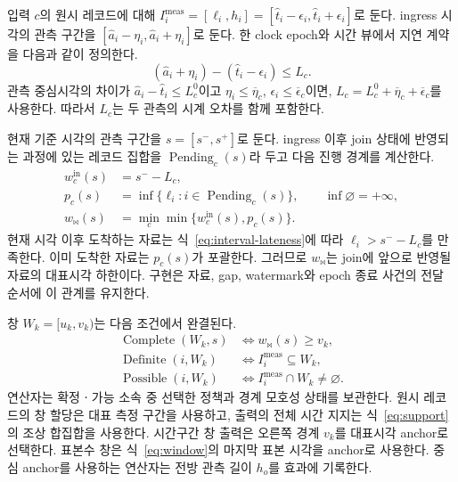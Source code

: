 입력 $c$의 원시 레코드에 대해
$I_i^{\mathrm{meas}}=[\ell_i,h_i]
=[\widehat t_i-\epsilon_i,\widehat t_i+\epsilon_i]$로 둔다.
ingress 시각의 관측 구간을
$[\widehat a_i-\eta_i,\widehat a_i+\eta_i]$로 둔다.
한 clock epoch와 시간 뷰에서 지연 계약을 다음과 같이 정의한다.
\begin{equation}
 (\widehat a_i+\eta_i)-(\widehat t_i-\epsilon_i)\le L_c.
 \label{eq:interval-lateness}
\end{equation}
관측 중심시각의 차이가 $\widehat a_i-\widehat t_i\le L_c^0$이고
$\eta_i\le\overline\eta_c$, $\epsilon_i\le\overline\epsilon_c$이면,
$L_c=L_c^0+\overline\eta_c+\overline\epsilon_c$를 사용한다.
따라서 $L_c$는 두 관측의 시계 오차를 함께 포함한다.

현재 기준 시각의 관측 구간을 $s=[s^-,s^+]$로 둔다.
ingress 이후 join 상태에 반영되는 과정에 있는 레코드 집합을
$\operatorname{Pending}_c(s)$라 두고 다음 진행 경계를 계산한다.
\begin{equation}
 \begin{aligned}
 w_c^{\mathrm{in}}(s)&=s^--L_c,\\
 p_c(s)&=\inf\{\ell_i:i\in\operatorname{Pending}_c(s)\},
                  \qquad\inf\varnothing=+\infty,\\
 w_{\Join}(s)&=\min_c\min\{w_c^{\mathrm{in}}(s),p_c(s)\}.
 \end{aligned}
 \label{eq:pending-watermark}
\end{equation}
현재 시각 이후 도착하는 자료는 식~\eqref{eq:interval-lateness}에 따라
$\ell_i>s^--L_c$를 만족한다. 이미 도착한 자료는 $p_c(s)$가 포괄한다.
그러므로 $w_{\Join}$는 join에 앞으로 반영될 자료의 대표시각 하한이다.
구현은 자료, gap, watermark와 epoch 종료 사건의 전달 순서에 이 관계를 유지한다.

창 $W_k=[u_k,v_k)$는 다음 조건에서 완결된다.
\begin{equation}
 \begin{aligned}
 \operatorname{Complete}(W_k,s)&\iff w_{\Join}(s)\ge v_k,\\
 \operatorname{Definite}(i,W_k)&\iff I_i^{\mathrm{meas}}\subseteq W_k,\\
 \operatorname{Possible}(i,W_k)&\iff
                         I_i^{\mathrm{meas}}\cap W_k\ne\varnothing.
 \end{aligned}
 \label{eq:window-complete}
\end{equation}
연산자는 확정ㆍ가능 소속 중 선택한 정책과 경계 모호성 상태를 보관한다.
원시 레코드의 창 할당은 대표 측정 구간을 사용하고,
출력의 전체 시간 지지는 식~\eqref{eq:support}의 조상 합집합을 사용한다.
시간구간 창 출력은 오른쪽 경계 $v_k$를 대표시각 anchor로 선택한다.
표본수 창은 식~\eqref{eq:window}의 마지막 표본 시각을 anchor로 사용한다.
중심 anchor를 사용하는 연산자는 전방 관측 길이 $h_o$를 효과에 기록한다.


